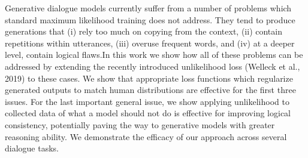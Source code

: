 Generative dialogue models currently suffer from a number of problems which standard maximum likelihood training does not address. They tend to produce generations that (i) rely too much on copying from the context, (ii) contain repetitions within utterances, (iii) overuse frequent words, and (iv) at a deeper level, contain logical flaws.In this work we show how all of these problems can be addressed by extending the recently introduced unlikelihood loss (Welleck et al., 2019) to these cases. We show that appropriate loss functions which regularize generated outputs to match human distributions are effective for the first three issues. For the last important general issue, we show applying unlikelihood to  collected data of what a model should not do is effective for improving logical consistency, potentially paving the way to generative models with greater reasoning ability. We demonstrate the efficacy of our approach across several dialogue tasks.
